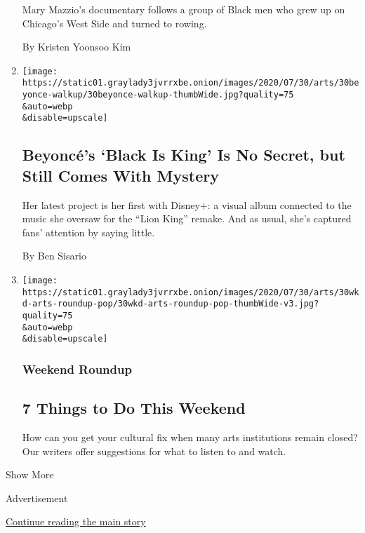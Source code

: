 \begin{enumerate}
  Mary Mazzio's documentary follows a group of Black men who grew up on
  Chicago's West Side and turned to rowing.

  By Kristen Yoonsoo Kim
\item
  \href{/2020/07/30/arts/music/beyonce-black-is-king.html}{}

  \texttt{[image: https://static01.graylady3jvrrxbe.onion/images/2020/07/30/arts/30beyonce-walkup/30beyonce-walkup-thumbWide.jpg?quality=75\\\&auto=webp\\\&disable=upscale]}

  \hypertarget{beyoncuxe9s-black-is-king-is-no-secret-but-still-comes-with-mystery}{%
  \subsection{Beyoncé's `Black Is King' Is No Secret, but Still Comes
  With
  Mystery}\label{beyoncuxe9s-black-is-king-is-no-secret-but-still-comes-with-mystery}}

  Her latest project is her first with Disney+: a visual album connected
  to the music she oversaw for the ``Lion King'' remake. And as usual,
  she's captured fans' attention by saying little.

  By Ben Sisario
\item
  \href{/2020/07/30/arts/things-to-do-weekend-coronavirus.html}{}

  \texttt{[image: https://static01.graylady3jvrrxbe.onion/images/2020/07/30/arts/30wkd-arts-roundup-pop/30wkd-arts-roundup-pop-thumbWide-v3.jpg?quality=75\\\&auto=webp\\\&disable=upscale]}

  \hypertarget{weekend-roundup}{%
  \subsubsection{Weekend Roundup}\label{weekend-roundup}}

  \hypertarget{7-things-to-do-this-weekend}{%
  \subsection{7 Things to Do This
  Weekend}\label{7-things-to-do-this-weekend}}

  How can you get your cultural fix when many arts institutions remain
  closed? Our writers offer suggestions for what to listen to and watch.
\end{enumerate}

Show More

Advertisement

\protect\hyperlink{after-mid2}{Continue reading the main story}

